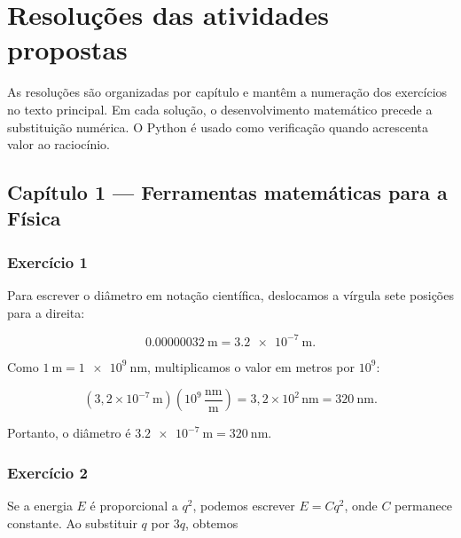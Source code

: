 \chapter{Resoluções das atividades propostas}
\label{cap:solucoes}

\setcounter{equation}{0}
\renewcommand{\theequation}{S.\arabic{equation}}
\setcounter{solucaolistingbase}{\value{lstlisting}}
\renewcommand{\thelstlisting}{S.\number\numexpr
  \value{lstlisting}-\value{solucaolistingbase}\relax}

As resoluções são organizadas por capítulo e mantêm a numeração dos exercícios no texto principal. Em cada solução, o desenvolvimento matemático precede a substituição numérica. O Python é usado como verificação quando acrescenta valor ao raciocínio.

\section*{Capítulo 1 — Ferramentas matemáticas para a Física}

\subsection*{Exercício 1}

Para escrever o diâmetro em notação científica, deslocamos a vírgula sete posições para a direita:

\begin{equation}
  \SI{0.00000032}{\meter}
  =\SI{3.2e-7}{\meter}.
\end{equation}

Como \(\SI{1}{\meter}=\SI{1e9}{\nano\meter}\), multiplicamos o valor em metros por \(10^9\):

\begin{equation}
  (3{,}2\times10^{-7}\,\si{\meter})
  \left(10^9\,\frac{\si{\nano\meter}}{\si{\meter}}\right)
  =3{,}2\times10^2\,\si{\nano\meter}
  =\SI{320}{\nano\meter}.
\end{equation}

Portanto, o diâmetro é \(\boxed{\SI{3.2e-7}{\meter}=\SI{320}{\nano\meter}}\).

\subsection*{Exercício 2}

Se a energia \(E\) é proporcional a \(q^2\), podemos escrever \(E=Cq^2\), onde \(C\) permanece constante. Ao substituir \(q\) por \(3q\), obtemos

